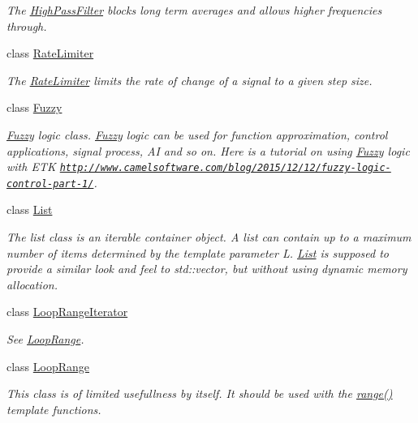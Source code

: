 \begin{DoxyCompactItemize}
\begin{DoxyCompactList}\small\item\em The \hyperlink{classetk_1_1_high_pass_filter}{High\-Pass\-Filter} blocks long term averages and allows higher frequencies through. \end{DoxyCompactList}\item 
class \hyperlink{classetk_1_1_rate_limiter}{Rate\-Limiter}
\begin{DoxyCompactList}\small\item\em The \hyperlink{classetk_1_1_rate_limiter}{Rate\-Limiter} limits the rate of change of a signal to a given step size. \end{DoxyCompactList}\item 
class \hyperlink{classetk_1_1_fuzzy}{Fuzzy}
\begin{DoxyCompactList}\small\item\em \hyperlink{classetk_1_1_fuzzy}{Fuzzy} logic class. \hyperlink{classetk_1_1_fuzzy}{Fuzzy} logic can be used for function approximation, control applications, signal process, A\-I and so on. Here is a tutorial on using \hyperlink{classetk_1_1_fuzzy}{Fuzzy} logic with E\-T\-K \href{http://www.camelsoftware.com/blog/2015/12/12/fuzzy-logic-control-part-1/}{\tt http\-://www.\-camelsoftware.\-com/blog/2015/12/12/fuzzy-\/logic-\/control-\/part-\/1/}. \end{DoxyCompactList}\item 
class \hyperlink{classetk_1_1_list}{List}
\begin{DoxyCompactList}\small\item\em The list class is an iterable container object. A list can contain up to a maximum number of items determined by the template parameter L. \hyperlink{classetk_1_1_list}{List} is supposed to provide a similar look and feel to std\-::vector, but without using dynamic memory allocation. \end{DoxyCompactList}\item 
class \hyperlink{classetk_1_1_loop_range_iterator}{Loop\-Range\-Iterator}
\begin{DoxyCompactList}\small\item\em See \hyperlink{classetk_1_1_loop_range}{Loop\-Range}. \end{DoxyCompactList}\item 
class \hyperlink{classetk_1_1_loop_range}{Loop\-Range}
\begin{DoxyCompactList}\small\item\em This class is of limited usefullness by itself. It should be used with the \hyperlink{namespaceetk_aff39b0f367ee4d947e2e7d297ffd506b}{range()} template functions. \end{DoxyCompactList}\item 

\end{DoxyCompactItemize}

